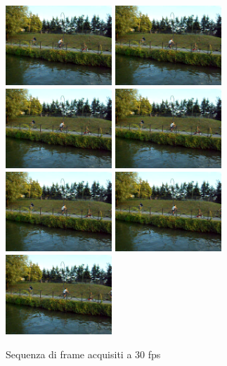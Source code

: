 \begin{figure}[tb]
	\includegraphics[width = 4cm]{./pictures/FPSalto/img0006}
	\includegraphics[width = 4cm]{./pictures/FPSalto/img0007}
	\includegraphics[width = 4cm]{./pictures/FPSalto/img0008}
	\includegraphics[width = 4cm]{./pictures/FPSalto/img0009}
	\includegraphics[width = 4cm]{./pictures/FPSalto/img0010}
	\includegraphics[width = 4cm]{./pictures/FPSalto/img0011}
	\includegraphics[width = 4cm]{./pictures/FPSalto/img0012}
	\caption{Sequenza di frame acquisiti a 30 fps}
	\label{fig:acquisizioneContinua}
\end{figure}
